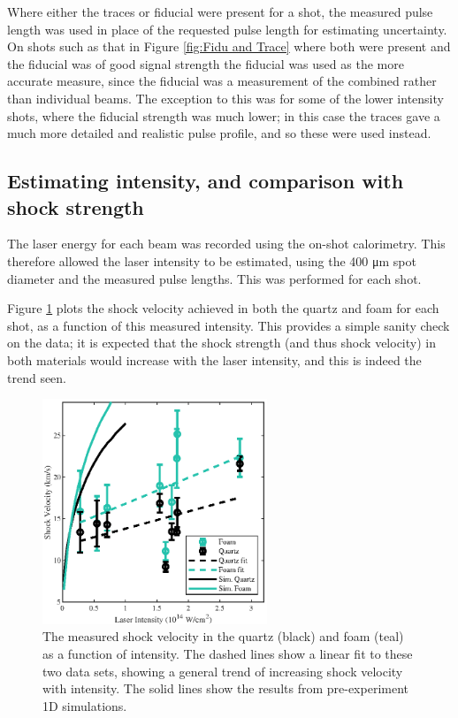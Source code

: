 Where either the traces or fiducial were present for a shot, the measured pulse length was used in place of the requested pulse length for estimating uncertainty. On shots such as that in Figure \ref{fig:Fidu and Trace} where both were present and the fiducial was of good signal strength the fiducial was used as the more accurate measure, since the fiducial was a measurement of the combined rather than individual beams. The exception to this was for some of the lower intensity shots, where the fiducial strength was much lower; in this case the traces gave a much more detailed and realistic pulse profile, and so these were used instead.

\subsection{Estimating intensity, and comparison with shock strength} \label{Intensity vs Shock Velocity}

The laser energy for each beam was recorded using the on-shot calorimetry. This therefore allowed the laser intensity to be estimated, using the 400 \unit{\micro\meter} spot diameter and the measured pulse lengths. This was performed for each shot.

Figure \ref{fig:Intensity} plots the shock velocity achieved in both the quartz and foam for each shot, as a function of this measured intensity. This provides a simple sanity check on the data; it is expected that the shock strength (and thus shock velocity) in both materials would increase with the laser intensity, and this is indeed the trend seen.

\begin{figure} [h]
\begin{centering}
\includegraphics[width=0.6\textwidth]{figures/Experiment/Intensity.eps}%
\caption{\label{fig:Intensity} The measured shock velocity in the quartz (black) and foam (teal) as a function of intensity. The dashed lines show a linear fit to these two data sets, showing a general trend of increasing shock velocity with intensity. The solid lines show the results from pre-experiment 1D simulations.}
\end{centering}
\end{figure}

